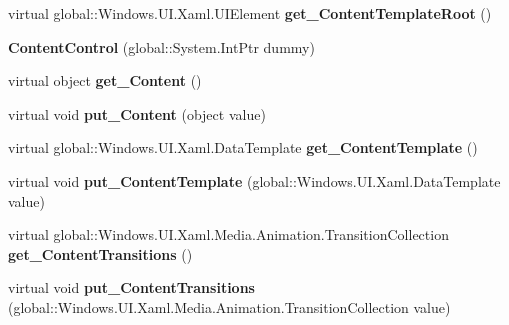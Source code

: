 \begin{DoxyCompactItemize}
virtual global\+::\+Windows.\+U\+I.\+Xaml.\+U\+I\+Element {\bfseries get\+\_\+\+Content\+Template\+Root} ()
\item 
\mbox{\label{class_windows_1_1_u_i_1_1_xaml_1_1_controls_1_1_content_control_a54ac07e93dd29c05ab129eb11a433a57}} 
{\bfseries Content\+Control} (global\+::\+System.\+Int\+Ptr dummy)
\item 
\mbox{\label{class_windows_1_1_u_i_1_1_xaml_1_1_controls_1_1_content_control_a1398a502667d7adf98f72f4ae5c485c9}} 
virtual object {\bfseries get\+\_\+\+Content} ()
\item 
\mbox{\label{class_windows_1_1_u_i_1_1_xaml_1_1_controls_1_1_content_control_ac840a1532f5f739ccb323a723b58454b}} 
virtual void {\bfseries put\+\_\+\+Content} (object value)
\item 
\mbox{\label{class_windows_1_1_u_i_1_1_xaml_1_1_controls_1_1_content_control_a5cc3b93bc15a1c9c0ed277ec8dc6dfe9}} 
virtual global\+::\+Windows.\+U\+I.\+Xaml.\+Data\+Template {\bfseries get\+\_\+\+Content\+Template} ()
\item 
\mbox{\label{class_windows_1_1_u_i_1_1_xaml_1_1_controls_1_1_content_control_ab0e5c4f7859f68ed01991a8e932e4bda}} 
virtual void {\bfseries put\+\_\+\+Content\+Template} (global\+::\+Windows.\+U\+I.\+Xaml.\+Data\+Template value)
\item 
\mbox{\label{class_windows_1_1_u_i_1_1_xaml_1_1_controls_1_1_content_control_a074c0bbf88ba02121501aea5d840d64f}} 
virtual global\+::\+Windows.\+U\+I.\+Xaml.\+Media.\+Animation.\+Transition\+Collection {\bfseries get\+\_\+\+Content\+Transitions} ()
\item 
\mbox{\label{class_windows_1_1_u_i_1_1_xaml_1_1_controls_1_1_content_control_aa5fc9bac28b70e7fe86efcb229e8c57d}} 
virtual void {\bfseries put\+\_\+\+Content\+Transitions} (global\+::\+Windows.\+U\+I.\+Xaml.\+Media.\+Animation.\+Transition\+Collection value)

\end{DoxyCompactItemize}
